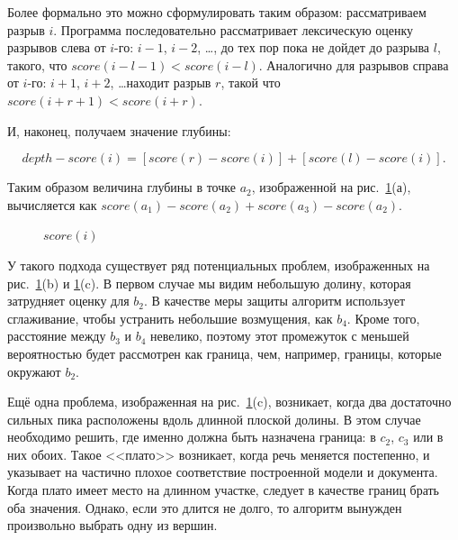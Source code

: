 \documentclass[12pt]{article}
\begin{document}
\begin{enumerate}
{		Более формально это можно сформулировать таким образом: рассматриваем разрыв $i$. Программа последовательно рассматривает лексическую оценку разрывов слева от $i$-го: $i-1$, $i-2$, \ldots, до тех пор пока не дойдет до разрыва $l$, такого, что $score(i-l-1) < score(i-l)$. Аналогично для разрывов справа от $i$-го: $i+1$, $i+2$, \ldots находит разрыв $r$, такой что $score(i+r+1) < score(i+r)$. 
		
		И, наконец, получаем значение глубины: 
		
			$$depth-score(i) = [score(r) - score(i)] + [score(l) - score(i)].$$
		
		
		Таким образом величина глубины в точке $a_2$, изображенной на рис.~\ref{im3}(а), вычисляется как $score(a_1) - score(a_2) + score(a_3) - score(a_2)$.
		
		\vspace{5pt}
		\begin{figure}[h!]
			\caption{$score(i)$}
			\label{im3}
		\end{figure}
		\vspace{5pt}
		
		У такого подхода существует ряд потенциальных проблем, изображенных на рис.~\ref{im3}(b) и \ref{im3}(c). В первом случае мы видим небольшую долину, которая затрудняет оценку для $b_2$. В качестве меры защиты алгоритм использует сглаживание, чтобы устранить небольшие возмущения, как $b_4$. Кроме того, расстояние между $b_3$ и $b_4$ невелико, поэтому этот промежуток с меньшей вероятностью будет рассмотрен как граница, чем, например, границы, которые окружают $b_2$. 
		
		Ещё одна проблема, изображенная на рис.~\ref{im3}(c), возникает, когда два достаточно сильных пика расположены вдоль длинной плоской долины. В этом случае необходимо решить, где именно должна быть назначена граница: в $c_2$, $c_3$ или в них обоих. Такое <<плато>> возникает, когда речь меняется постепенно, и указывает на частично плохое соответствие построенной модели и документа. Когда плато имеет место на длинном участке, следует в качестве границ брать оба значения. Однако, если это длится не долго, то алгоритм вынужден произвольно выбрать одну из вершин. 
		
}
\end{enumerate}
\end{document}
